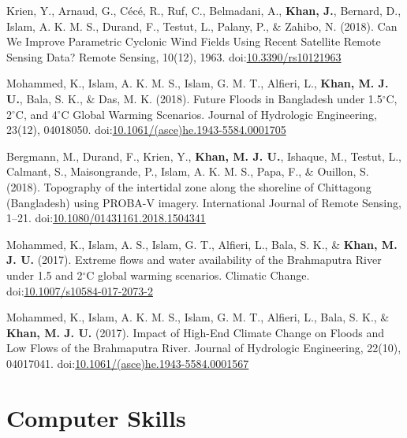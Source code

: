 \documentclass[11pt,a4paper,sans]{moderncv}
\begin{document}
\begin{hangparas}{1cm}{1}
Krien, Y., Arnaud, G., C\'ec\'e, R., Ruf, C., Belmadani, A., \textbf{Khan, J.}, Bernard, D., Islam, A. K. M. S., Durand, F., Testut, L., Palany, P., \& Zahibo, N. (2018). Can We Improve Parametric Cyclonic Wind Fields Using Recent Satellite Remote Sensing Data? Remote Sensing, 10(12), 1963. doi:\href{https://doi.org/10.3390/rs10121963}{10.3390/rs10121963} 

Mohammed, K., Islam, A. K. M. S., Islam, G. M. T., Alfieri, L., \textbf{Khan, M. J. U.}, Bala, S. K., \& Das, M. K. (2018). Future Floods in Bangladesh under 1.5$^{\circ}$C, 2$^{\circ}$C, and 4$^{\circ}$C Global Warming Scenarios. Journal of Hydrologic Engineering, 23(12), 04018050. doi:\href{https://doi.org/10.1061/(asce)he.1943-5584.0001705}{10.1061/(asce)he.1943-5584.0001705} 

Bergmann, M., Durand, F., Krien, Y., \textbf{Khan, M. J. U.}, Ishaque, M., Testut, L., Calmant, S., Maisongrande, P., Islam, A. K. M. S., Papa, F., \& Ouillon, S. (2018). Topography of the intertidal zone along the shoreline of Chittagong (Bangladesh) using PROBA-V imagery. International Journal of Remote Sensing, 1--21. doi:\href{https://doi.org/10.1080/01431161.2018.1504341}{10.1080/01431161.2018.1504341} 

Mohammed, K., Islam, A. S., Islam, G. T., Alfieri, L., Bala, S. K., \& \textbf{Khan, M. J. U.} (2017). Extreme flows and water availability of the Brahmaputra River under 1.5 and 2$^{\circ}$C global warming scenarios. Climatic Change. doi:\href{https://doi.org/10.1007/s10584-017-2073-2}{10.1007/s10584-017-2073-2} 

Mohammed, K., Islam, A. K. M. S., Islam, G. M. T., Alfieri, L., Bala, S. K., \& \textbf{Khan, M. J. U.} (2017). Impact of High-End Climate Change on Floods and Low Flows of the Brahmaputra River. Journal of Hydrologic Engineering, 22(10), 04017041. doi:\href{https://doi.org/10.1061/(asce)he.1943-5584.0001567}{10.1061/(asce)he.1943-5584.0001567}

\end{hangparas}


\section{Computer Skills}
\end{document}
